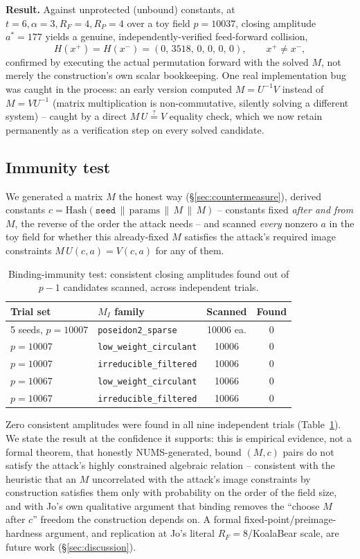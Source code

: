 \documentclass[conference]{IEEEtran}
\theoremstyle{definition}
\theoremstyle{plain}
\begin{document}
\textbf{Result.} Against unprotected (unbound) constants, at
$t=6,\alpha=3,R_F=4,R_P=4$ over a toy field $p=10037$, closing amplitude
$a^{*}=177$ yields a genuine, independently-verified feed-forward
collision,
\[
  H(x^+)=H(x^-)=(0,\,3518,\,0,\,0,\,0,\,0),\qquad x^+\ne x^-,
\]
confirmed by executing the actual permutation forward with the solved
$M$, not merely the construction's own scalar bookkeeping. One real
implementation bug was caught in the process: an early version computed
$M=U^{-1}V$ instead of $M=VU^{-1}$ (matrix multiplication is
non-commutative, silently solving a different system) -- caught by a
direct $M\,U\stackrel{?}{=}V$ equality check, which we now retain
permanently as a verification step on every solved candidate.

\subsection{Immunity test}
We generated a matrix $M$ the honest way
(\S\ref{sec:countermeasure}), derived constants
$c=\mathrm{Hash}(\texttt{seed}\,\|\,\mathrm{params}\,\|\,M\,\|\,M)$ --
constants fixed \emph{after and from} $M$, the reverse of the order the
attack needs -- and scanned \emph{every} nonzero $a$ in the toy field
for whether this already-fixed $M$ satisfies the attack's required image
constraints $M\,U(c,a)=V(c,a)$ for any of them.

\begin{table}[t]
\centering
\caption{Binding-immunity test: consistent closing amplitudes found out
of $p-1$ candidates scanned, across independent trials.}
\label{tab:immunity}
\small
\begin{tabular}{@{}llcc@{}}
\toprule
Trial set & $M_I$ family & Scanned & Found \\
\midrule
5 seeds, $p=10007$ & \texttt{poseidon2\_sparse} & 10006 ea. & 0 \\
$p=10007$ & \texttt{low\_weight\_circulant} & 10006 & 0 \\
$p=10007$ & \texttt{irreducible\_filtered} & 10006 & 0 \\
$p=10067$ & \texttt{low\_weight\_circulant} & 10066 & 0 \\
$p=10067$ & \texttt{irreducible\_filtered} & 10066 & 0 \\
\bottomrule
\end{tabular}
\end{table}

Zero consistent amplitudes were found in all nine independent trials
(Table~\ref{tab:immunity}). We state the result at the confidence it
supports: this is empirical evidence, not a formal theorem, that
honestly NUMS-generated, bound $(M,c)$ pairs do not satisfy the attack's
highly constrained algebraic relation -- consistent with the heuristic
that an $M$ uncorrelated with the attack's image constraints by
construction satisfies them only with probability on the order of the
field size, and with Jo's own qualitative argument that binding removes
the ``choose $M$ after $c$'' freedom the construction depends on. A
formal fixed-point/preimage-hardness argument, and replication at Jo's
literal $R_F=8$/KoalaBear scale, are future work
(\S\ref{sec:discussion}).
\end{document}
